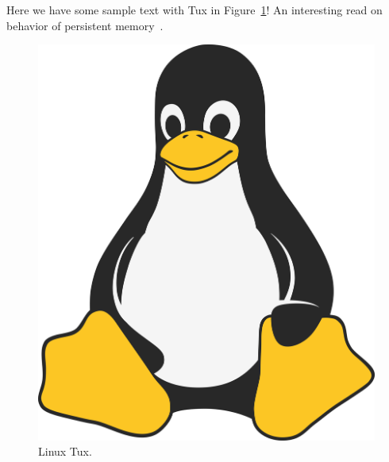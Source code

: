 Here we have some sample text with Tux in Figure~\ref{fig:linux-tux}!
An interesting read on behavior of persistent memory~\cite{inproceedings:pmemguide}.

\lipsum[2-4]

\begin{figure}  %
    \begin{center}
        \includegraphics[width=.4\textwidth]{images/linux-tux.png}
    \end{center}
    \caption{Linux Tux.}
    \label{fig:linux-tux}
\end{figure}